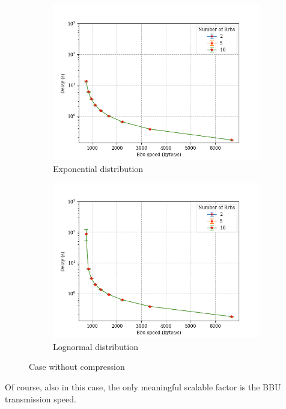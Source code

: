 \documentclass[11pt,a4paper,oneside, openright]{article}
\begin{document}
\begin{figure}
\centering
\begin{subfigure}{.5\textwidth}
  \centering
  \includegraphics[width=\linewidth]{images/case-a-exp}
  \caption{Exponential distribution}
  \label{fig:case-a-exp}
\end{subfigure}%
\begin{subfigure}{.5\textwidth}
  \centering
  \includegraphics[width=\linewidth]{images/case-a-logn}
  \caption{Lognormal distribution}
  \label{fig:case-a-log}
\end{subfigure}
\caption{Case without compression}
\label{fig:case-a}
\end{figure}

Of course, also in this case, the only meaningful scalable factor is the BBU transmission speed.
\bigbreak
\end{document}
